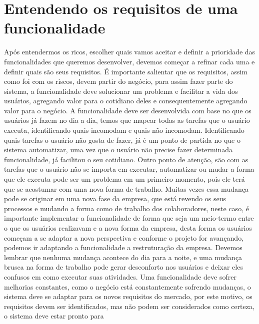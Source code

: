       \section{Entendendo os requisitos de uma funcionalidade}
        Após entendermos os ricos, escolher quais vamos aceitar e definir a prioridade
        das funcionalidades que queremos desenvolver, devemos começar a refinar cada
        uma e definir quais são seus requisitos. É importante salientar que os
        requisitos, assim como foi com os riscos, devem partir do negócio, para assim
        fazer parte do sistema, a funcionalidade deve solucionar um problema e facilitar
        a vida dos usuários, agregando valor para o cotidiano deles e consequentemente
        agregando valor para o negócio. \newline
        A funcionalidade deve ser desenvolvida com base no que os usuários já fazem
        no dia a dia, temos que mapear todas as tarefas que o usuário executa,
        identificando quais incomodam e quais não incomodam. Identificando quais tarefas
        o usuário não gosta de fazer, já é um ponto de partida no que o sistema
        automatizar, uma vez que o usuário não precise fazer determinada funcionalidade,
        já facilitou o seu cotidiano. Outro ponto de atenção, são com as tarefas que
        o usuário não se importa em executar, automatizar ou mudar a forma que ele
        executa pode ser um problema em um primeiro momento, pois ele terá que se
        acostumar com uma nova forma de trabalho. Muitas vezes essa mudança
        pode se originar em uma nova fase da empresa, que está revendo os seus processos
        e mudando a forma como de trabalho dos colaboradores, neste caso, é importante
        implementar a funcionalidade de forma que seja um meio-termo entre o que os
        usuários realizavam e a nova forma da empresa, desta forma os usuários
        começam a se adaptar a nova perspectiva e conforme o projeto for avançando,
        podemos ir adaptando a funcionalidade a restruturação da empresa. Devemos
        lembrar que nenhuma mudança acontece do dia para a noite, e uma mudança
        brusca na forma de trabalho pode gerar desconforto nos usuários e deixar eles
        confusos em como executar suas atividades. \newline
        Uma funcionalidade deve sofrer melhorias constantes, como o negócio está
        constantemente sofrendo mudanças, o sistema deve se adaptar para os novos
        requisitos do mercado, por este motivo, os requisitos devem ser identificados,
        mas não podem ser considerados como certeza, o sistema deve estar pronto para
